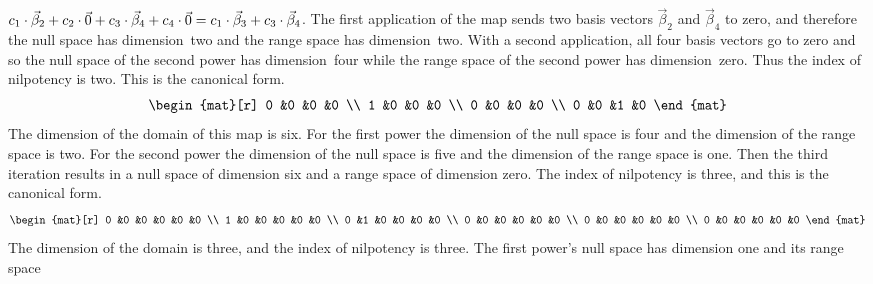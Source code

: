\begin{exercises}
\begin{answer}
\begin{exparts}
          $c_1\cdot \vec{\beta}_2+c_2\cdot \vec{0}
            +c_3\cdot \vec{\beta}_4+c_4\cdot \vec{0}
           =c_1\cdot \vec{\beta}_3+c_3\cdot\vec{\beta}_4$.
          The first application of the map
          sends two basis vectors $\vec{\beta}_2$ and
          $\vec{\beta}_4$ to zero,
          and therefore the null space has dimension~two and the range space
          has dimension~two.
          With a second application, all four basis vectors go to
          zero and so the null space of the second power has dimension~four
          while the range space of the second power has dimension~zero.
          Thus the index of nilpotency is two.
          This is the canonical form.
          \begin{equation*}
            \begin{mat}[r]
              0  &0  &0  &0  \\
              1  &0  &0  &0  \\
              0  &0  &0  &0  \\
              0  &0  &1  &0
            \end{mat}
          \end{equation*}
        \partsitem The dimension of the domain of this map is six.
          For the first power the dimension of the null space is four
          and the dimension of the range space is two.
          For the second power the dimension of the null space is five
          and the dimension of the range space is one.
          Then the third iteration results in a null space of dimension
          six and a range space of dimension zero.
          The index of nilpotency is three, and this is the
          canonical form.
          \begin{equation*}
            \begin{mat}[r]
              0  &0  &0  &0  &0  &0  \\
              1  &0  &0  &0  &0  &0  \\
              0  &1  &0  &0  &0  &0  \\
              0  &0  &0  &0  &0  &0  \\              
              0  &0  &0  &0  &0  &0  \\              
              0  &0  &0  &0  &0  &0  
            \end{mat}
          \end{equation*}
        \partsitem The dimension of the domain is three, and the index of 
          nilpotency is three.
          The first power's null space has dimension one and its range space

\end{exparts}
\end{answer}
\end{exercises}
